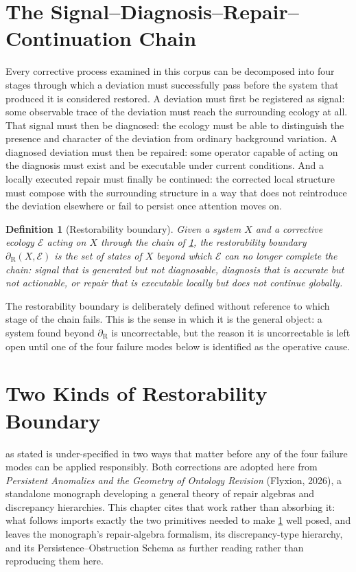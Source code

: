 \documentclass[12pt]{report}
\newtheorem{definition}{Definition}[section]
\newcommand{\Rboundary}[1][]{\ensuremath{\partial_{\mathrm{R}#1}}}
\begin{document}
\section{The Signal--Diagnosis--Repair--Continuation Chain}
\label{sec:chain}

Every corrective process examined in this corpus can be decomposed into
four stages through which a deviation must successfully pass before the
system that produced it is considered restored. A deviation must first be
registered as signal: some observable trace of the deviation must reach
the surrounding ecology at all. That signal must then be diagnosed: the
ecology must be able to distinguish the presence and character of the
deviation from ordinary background variation. A diagnosed deviation must
then be repaired: some operator capable of acting on the diagnosis must
exist and be executable under current conditions. And a locally executed
repair must finally be continued: the corrected local structure must
compose with the surrounding structure in a way that does not reintroduce
the deviation elsewhere or fail to persist once attention moves on.

\begin{definition}[Restorability boundary]
\label{def:boundary}
Given a system $X$ and a corrective ecology $\mathcal{E}$ acting on $X$
through the chain of \cref{sec:chain}, the restorability boundary
$\Rboundary(X,\mathcal{E})$ is the set of states of $X$ beyond which
$\mathcal{E}$ can no longer complete the chain: signal that is generated
but not diagnosable, diagnosis that is accurate but not actionable, or
repair that is executable locally but does not continue globally.
\end{definition}

The restorability boundary is deliberately defined without reference to
which stage of the chain fails. This is the sense in which it is the
general object: a system found beyond $\Rboundary$ is uncorrectable, but
the reason it is uncorrectable is left open until one of the four failure
modes below is identified as the operative cause.

\section{Two Kinds of Restorability Boundary}
\label{sec:two-kinds}

 as stated is under-specified in two ways that matter
before any of the four failure modes can be applied responsibly. Both
corrections are adopted here from \emph{Persistent Anomalies and the
Geometry of Ontology Revision} (Flyxion, 2026), a standalone monograph
developing a general theory of repair algebras and discrepancy hierarchies.
This chapter cites that work rather than absorbing it: what follows imports
exactly the two primitives needed to make \cref{def:boundary} well posed,
and leaves the monograph's repair-algebra formalism, its discrepancy-type
hierarchy, and its Persistence--Obstruction Schema as further reading
rather than reproducing them here.
\end{document}
